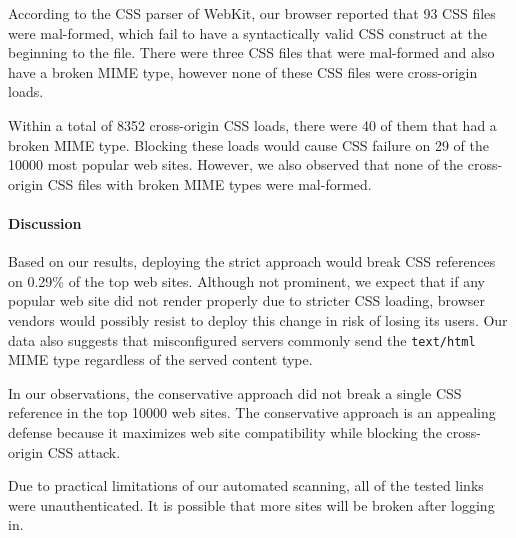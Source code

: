 \documentclass{acm_proc_article-sp}
\begin{document}
According to the CSS parser of WebKit, our browser reported that 93 CSS files were mal-formed, which fail to have a syntactically valid CSS construct at the beginning to the file. There were three CSS files that were mal-formed and also have a broken MIME type, however none of these CSS files were cross-origin loads.

Within a total of 8352 cross-origin CSS loads, there were 40 of them that had a broken MIME type. Blocking these loads would cause CSS failure on 29 of the 10000 most popular web sites. However, we also observed that none of the cross-origin CSS files with broken MIME types were mal-formed.


\paragraph{Discussion}
Based on our results, deploying the strict approach would break CSS references on 0.29\% of the top web sites. Although not prominent, we expect that if any popular web site did not render properly due to stricter CSS loading, browser vendors would possibly resist to deploy this change in risk of losing its users. Our data also suggests that misconfigured servers commonly send the \texttt{text/html} MIME type regardless of the served content type.

In our observations, the conservative approach did not break a single CSS reference in the top 10000 web sites. The conservative approach is an appealing defense because it maximizes web site compatibility while blocking the cross-origin CSS attack.

Due to practical limitations of our automated scanning, all of the tested links were unauthenticated. It is possible that more sites will be broken after logging in.
\end{document}

